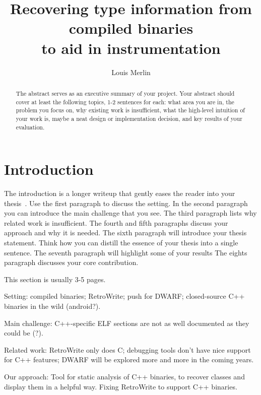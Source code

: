 \documentclass[a4paper,11pt,oneside]{report}
\title{Recovering type information from compiled binaries\\to aid in instrumentation}
\author{Louis Merlin}
\begin{document}
\maketitle
\makededication
\makeacks

\begin{abstract}
The abstract serves as an executive summary of your project.
Your abstract should cover at least the following topics, 1-2 sentences for
each: what area you are in, the problem you focus on, why existing work is
insufficient, what the high-level intuition of your work is, maybe a neat
design or implementation decision, and key results of your evaluation.
\end{abstract}


\maketoc

\chapter{Introduction}

The introduction is a longer writeup that gently eases the reader into your
thesis~\cite{dinesh20oakland}. Use the first paragraph to discuss the setting.
In the second paragraph you can introduce the main challenge that you see.
The third paragraph lists why related work is insufficient.
The fourth and fifth paragraphs discuss your approach and why it is needed.
The sixth paragraph will introduce your thesis statement. Think how you can
distill the essence of your thesis into a single sentence.
The seventh paragraph will highlight some of your results
The eights paragraph discusses your core contribution.

This section is usually 3-5 pages.

Setting: compiled binaries; RetroWrite; push for DWARF; closed-source C++ binaries in the wild (android?).

Main challenge: C++-specific ELF sections are not as well documented as they could be (?).

Related work: RetroWrite only does C; debugging tools don't have nice support for C++ features; DWARF will be explored more and more in the coming years.

Our approach: Tool for static analysis of C++ binaries, to recover classes and display them in a helpful way. Fixing RetroWrite to support C++ binaries.
\end{document}
